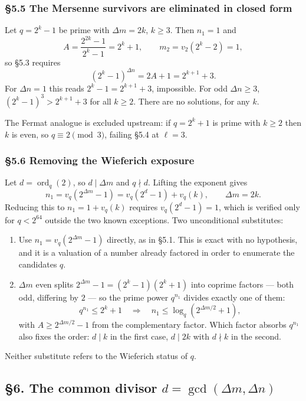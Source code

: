 \documentclass[11pt]{article}
\begin{document}
\subsubsection*{\S5.5 The Mersenne survivors are eliminated in closed form}

Let $q = 2^k-1$ be prime with $\Delta m = 2k$, $k \geq 3$. Then $n_1 = 1$ and
\[
A = \frac{2^{2k}-1}{2^k-1} = 2^k+1, \qquad m_2 = v_2\!\left(2^k-2\right) = 1,
\]
so \S5.3 requires
\[
\left(2^k-1\right)^{\Delta n} = 2A + 1 = 2^{k+1}+3 .
\]
For $\Delta n = 1$ this reads $2^k - 1 = 2^{k+1}+3$, impossible. For odd $\Delta n \geq 3$, $\left(2^k-1\right)^3 > 2^{k+1}+3$ for all $k \geq 2$. There are no solutions, for any $k$.

The Fermat analogue is excluded upstream: if $q = 2^k+1$ is prime with $k \geq 2$ then $k$ is even, so $q \equiv 2 \pmod 3$, failing \S5.4 at $\ell = 3$.

\subsubsection*{\S5.6 Removing the Wieferich exposure}

Let $d = \operatorname{ord}_q(2)$, so $d \mid \Delta m$ and $q \nmid d$. Lifting the exponent gives
\[
n_1 = v_q\!\left(2^{\Delta m}-1\right) = v_q\!\left(2^{d}-1\right) + v_q(k), \qquad \Delta m = 2k .
\]
Reducing this to $n_1 = 1 + v_q(k)$ requires $v_q(2^d-1) = 1$, which is verified only for $q < 2^{64}$ outside the two known exceptions. Two unconditional substitutes:

\begin{enumerate}
\item Use $n_1 = v_q\!\left(2^{\Delta m}-1\right)$ directly, as in \S5.1. This is exact with no hypothesis, and it is a valuation of a number already factored in order to enumerate the candidates $q$.
\item $\Delta m$ even splits $2^{\Delta m}-1 = \left(2^k-1\right)\left(2^k+1\right)$ into coprime factors --- both odd, differing by $2$ --- so the prime power $q^{n_1}$ divides exactly one of them:
\[
q^{n_1} \leq 2^k+1 \quad\Longrightarrow\quad n_1 \leq \log_q\!\left(2^{\Delta m/2}+1\right),
\]
with $A \geq 2^{\Delta m/2}-1$ from the complementary factor. Which factor absorbs $q^{n_1}$ also fixes the order: $d \mid k$ in the first case, $d \mid 2k$ with $d \nmid k$ in the second.
\end{enumerate}
Neither substitute refers to the Wieferich status of $q$.

\subsection*{\S6. The common divisor $d = \gcd(\Delta m, \Delta n)$}
\end{document}
